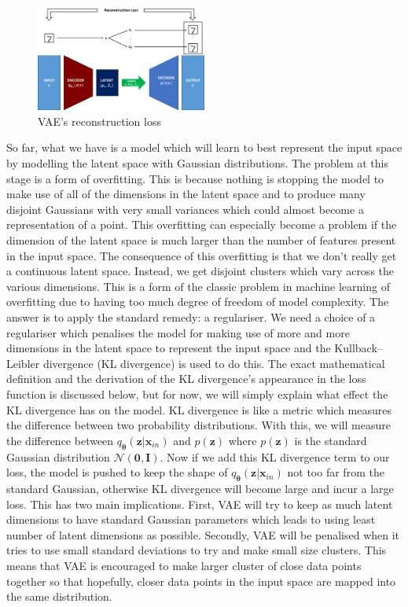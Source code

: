                 \begin{figure}[H] \label{fig:recon_loss}
                    \centering
                    \includegraphics[width=0.5\textwidth]{imgs/recon_loss.png}
                    \caption{VAE's reconstruction loss}
                \end{figure}
                
                So far, what we have is a model which will learn to best represent the input space by modelling the latent space with Gaussian distributions. The problem at this stage is a form of overfitting. This is because nothing is stopping the model to make use of all of the dimensions in the latent space and to produce many disjoint Gaussians with very small variances which could almost become a representation of a point. This overfitting can especially become a problem if the dimension of the latent space is much larger than the number of features present in the input space. The consequence of this overfitting is that we don't really get a continuous latent space. Instead, we get disjoint clusters which vary across the various dimensions. This is a form of the classic problem in machine learning of overfitting due to having too much degree of freedom of model complexity. The answer is to apply the standard remedy: a regulariser. We need a choice of a regulariser which penalises the model for making use of more and more dimensions in the latent space to represent the input space and the Kullback–Leibler divergence \citep{kullback1951information}(KL divergence) is used to do this. The exact mathematical definition and the derivation of the KL divergence's appearance in the loss function is discussed below, but for now, we will simply explain what effect the KL divergence has on the model. KL divergence is like a metric which measures the difference between two probability distributions. With this, we will measure the difference between $q_{\bm{\theta}}(\bm{z}|\bm{x}_{in})$ and $p(\bm{z})$ where $p(\bm{z})$ is the standard Gaussian distribution $\mathcal{N}(\bm{0}, \bm{I})$. Now if we add this KL divergence term to our loss, the model is pushed to keep the shape of $q_{\bm{\theta}}(\bm{z}|\bm{x}_{in})$ not too far from the standard Gaussian, otherwise KL divergence will become large and incur a large loss. This has two main implications. First, VAE will try to keep as much latent dimensions to have standard Gaussian parameters which leads to using least number of latent dimensions as possible. Secondly, VAE will be penalised when it tries to use small standard deviations to try and make small size clusters. This means that VAE is encouraged to make larger cluster of close data points together so that hopefully, closer data points in the input space are mapped into the same distribution.
                
